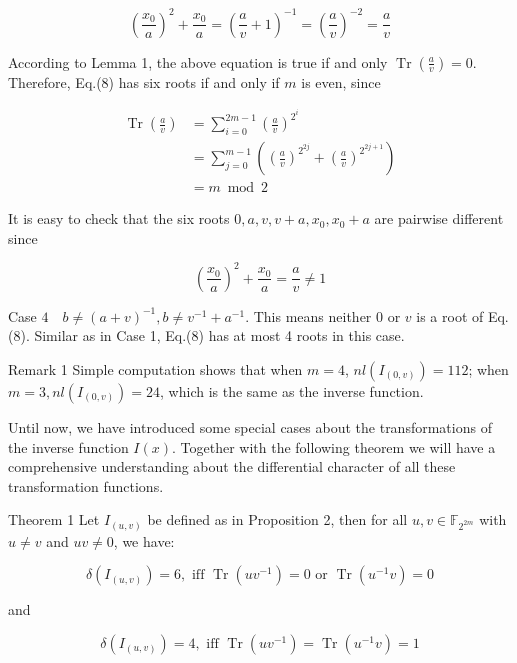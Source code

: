 \documentclass[10pt]{article}
\begin{document}
$$
\left(\frac{x_{0}}{a}\right)^{2}+\frac{x_{0}}{a}=\left(\frac{a}{v}+1\right)^{-1}=\left(\frac{a}{v}\right)^{-2}=\frac{a}{v}
$$

According to Lemma 1, the above equation is true if and only $\operatorname{Tr}\left(\frac{a}{v}\right)=0$. Therefore, Eq.(8) has six roots if and only if $m$ is even, since

$$
\begin{aligned}
\operatorname{Tr}\left(\frac{a}{v}\right) & =\sum_{i=0}^{2 m-1}\left(\frac{a}{v}\right)^{2^{i}} \\
& =\sum_{j=0}^{m-1}\left(\left(\frac{a}{v}\right)^{2^{2 j}}+\left(\frac{a}{v}\right)^{2^{2 j+1}}\right) \\
& =m \bmod 2
\end{aligned}
$$

It is easy to check that the six roots $0, a, v, v+a, x_{0}, x_{0}+a$ are pairwise different since

$$
\left(\frac{x_{0}}{a}\right)^{2}+\frac{x_{0}}{a}=\frac{a}{v} \neq 1
$$

Case $4 \quad b \neq(a+v)^{-1}, b \neq v^{-1}+a^{-1}$. This means neither 0 or $v$ is a root of Eq.(8). Similar as in Case 1, Eq.(8) has at most 4 roots in this case.

Remark 1 Simple computation shows that when $m=4$, $n l\left(I_{(0, v)}\right)=112$; when $m=3, n l\left(I_{(0, v)}\right)=24$, which is the same as the inverse function.

Until now, we have introduced some special cases about the transformations of the inverse function $I(x)$. Together with the following theorem we will have a comprehensive understanding about the differential character of all these transformation functions.

Theorem 1 Let $I_{(u, v)}$ be defined as in Proposition 2, then for all $u, v \in \mathbb{F}_{2^{2 m}}$ with $u \neq v$ and $u v \neq 0$, we have:


\begin{equation*}
\delta\left(I_{(u, v)}\right)=6, \text { iff } \operatorname{Tr}\left(u v^{-1}\right)=0 \text { or } \operatorname{Tr}\left(u^{-1} v\right)=0 \tag{9}
\end{equation*}


and


\begin{equation*}
\delta\left(I_{(u, v)}\right)=4, \text { iff } \operatorname{Tr}\left(u v^{-1}\right)=\operatorname{Tr}\left(u^{-1} v\right)=1 \tag{10}
\end{equation*}
\end{document}
